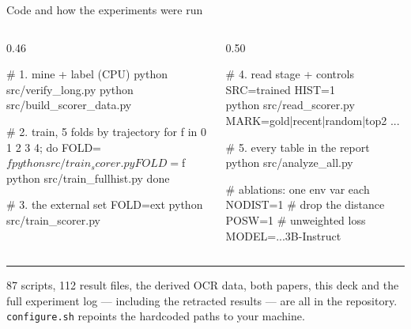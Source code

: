 \documentclass[aspectratio=169,10pt]{beamer}
\begin{document}
\begin{frame}[fragile]{Code and how the experiments were run}
\vspace{0.25cm}
\begin{columns}[T]
\begin{column}{0.46\textwidth}
{\scriptsize
\begin{semiverbatim}
\color{ncgray}# 1. mine + label (CPU)\color{black}
python src/verify_long.py
python src/build_scorer_data.py

\color{ncgray}# 2. train, 5 folds by trajectory\color{black}
for f in 0 1 2 3 4; do
  FOLD=$f python src/train_scorer.py
  FOLD=$f python src/train_fullhist.py
done

\color{ncgray}# 3. the external set\color{black}
FOLD=ext python src/train_scorer.py
\end{semiverbatim}}
\end{column}
\begin{column}{0.50\textwidth}
{\scriptsize
\begin{semiverbatim}
\color{ncgray}# 4. read stage + controls\color{black}
SRC=trained HIST=1 \\
  python src/read_scorer.py
MARK=gold|recent|random|top2 ...

\color{ncgray}# 5. every table in the report\color{black}
python src/analyze_all.py

\color{ncgray}# ablations: one env var each\color{black}
NODIST=1   \color{ncgray}# drop the distance\color{black}
POSW=1     \color{ncgray}# unweighted loss\color{black}
MODEL=...3B-Instruct
\end{semiverbatim}}
\end{column}
\end{columns}
\vspace{0.45cm}
\hrule
\vspace{0.3cm}
{\footnotesize 87 scripts, 112 result files, the derived OCR data, both papers, this deck and the full
experiment log --- including the retracted results --- are all in the repository.
\texttt{configure.sh} repoints the hardcoded paths to your machine.}
\end{frame}
\end{document}
